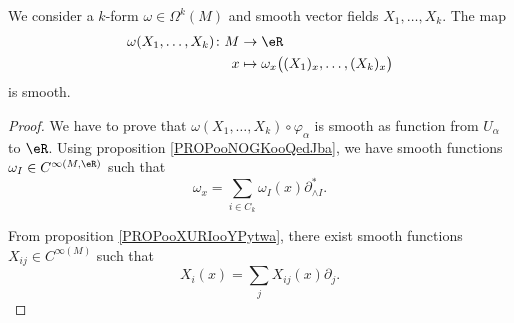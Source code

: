 \noproof


\begin{proposition}			\label{PROPooHTKMooVzYQdW}
	We consider a \( k\)-form \( \omega\in \Omega^k(M)\) and smooth vector fields \( X_1,\ldots,X_k\). The map
	\begin{equation}
		\begin{aligned}
			\omega(X_1,\ldots,X_k)\colon M & \to \eR                                            \\
			x                              & \mapsto \omega_x\big( (X_1)_x,\ldots,(X_k)_x \big)
		\end{aligned}
	\end{equation}
	is smooth.
\end{proposition}

\begin{proof}

	We have to prove that \( \omega(X_1,\ldots,X_k)\circ \varphi_{\alpha}\) is smooth as function from \( U_{\alpha}\) to \( \eR\). Using proposition \ref{PROPooNOGKooQedJba}, we have smooth functions \( \omega_I\in C^{\infty(M,\eR)}\) such that
	\begin{equation}
		\omega_x=\sum_{i\in C_k}\omega_I(x)\partial^*_{\wedge I}.
	\end{equation}

	From proposition \ref{PROPooXURIooYPytwa}, there exist smooth functions \( X_{ij}\in C^{\infty(M)}\) such that
	\begin{equation}
		X_i(x)=\sum_jX_{ij}(x)\partial_j.
	\end{equation}



\end{proof}
